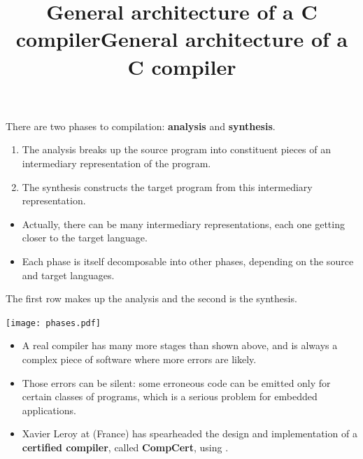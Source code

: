 \documentclass[wide]{slides}
\begin{document}
\begin{slide}
  \title{General architecture of a C compiler}

  There are two phases to compilation: \textbf{analysis} and
  \textbf{synthesis}.
  \begin{enumerate}

    \item The analysis breaks up the source program into
      constituent pieces of an intermediary representation of the
      program.

    \item The synthesis constructs the target program from this
      intermediary representation.

  \end{enumerate}
  \begin{itemize}

    \item Actually, there can be many intermediary representations,
      each one getting closer to the target language.

    \item Each phase is itself decomposable into other phases,
      depending on the source and target languages.

  \end{itemize}

\end{slide}

\begin{slide}
  \title{General architecture of a C compiler}

  The first row makes up the analysis and the second is the synthesis.

  \begin{center}
    \texttt{[image: phases.pdf]}
  \end{center}

  \begin{itemize}

    \item A real compiler has many more stages than shown above, and
      is always a complex piece of software where more errors are
      likely.

    \item Those errors can be silent: some erroneous code can be
      emitted only for certain classes of programs, which is a serious
      problem for embedded applications.

    \item Xavier Leroy at \Inria (France) has spearheaded the design
      and implementation of a \textbf{certified \Clang compiler},
      called \textbf{CompCert}, using \Coq.

  \end{itemize}

\end{slide}
\end{document}
